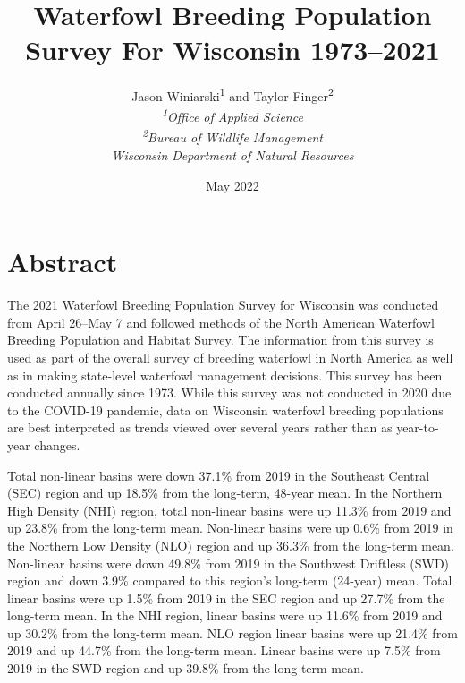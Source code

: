 \documentclass[
  12pt,
]{article}
\title{Waterfowl Breeding Population Survey For Wisconsin 1973--2021}
\author{Jason Winiarski\textsuperscript{1} and Taylor
Finger\textsuperscript{2}\\
\emph{\textsuperscript{1}Office of Applied Science}\\
\emph{\textsuperscript{2}Bureau of Wildlife Management}\\
\emph{Wisconsin Department of Natural Resources}}
\date{May 2022}
\begin{document}
\maketitle

{
\hypersetup{linkcolor=}
\setcounter{tocdepth}{3}
\tableofcontents
}
\newpage

\hypertarget{abstract}{%
\section{Abstract}\label{abstract}}

The 2021 Waterfowl Breeding Population Survey for Wisconsin was
conducted from April 26--May 7 and followed methods of the North
American Waterfowl Breeding Population and Habitat Survey. The
information from this survey is used as part of the overall survey of
breeding waterfowl in North America as well as in making state-level
waterfowl management decisions. This survey has been conducted annually
since 1973. While this survey was not conducted in 2020 due to the
COVID-19 pandemic, data on Wisconsin waterfowl breeding populations are
best interpreted as trends viewed over several years rather than as
year-to-year changes.

Total non-linear basins were down 37.1\% from 2019 in the Southeast
Central (SEC) region and up 18.5\% from the long-term, 48-year mean. In
the Northern High Density (NHI) region, total non-linear basins were up
11.3\% from 2019 and up 23.8\% from the long-term mean. Non-linear
basins were up 0.6\% from 2019 in the Northern Low Density (NLO) region
and up 36.3\% from the long-term mean. Non-linear basins were down
49.8\% from 2019 in the Southwest Driftless (SWD) region and down 3.9\%
compared to this region's long-term (24-year) mean. Total linear basins
were up 1.5\% from 2019 in the SEC region and up 27.7\% from the
long-term mean. In the NHI region, linear basins were up 11.6\% from
2019 and up 30.2\% from the long-term mean. NLO region linear basins
were up 21.4\% from 2019 and up 44.7\% from the long-term mean. Linear
basins were up 7.5\% from 2019 in the SWD region and up 39.8\% from the
long-term mean.
\end{document}
